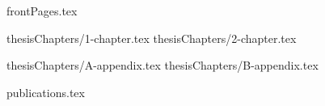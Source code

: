 \documentclass[a4paper,12pt,oneside,openany]{book}
\begin{document}
 {frontPages.tex}


 {thesisChapters/1-chapter.tex}
 {thesisChapters/2-chapter.tex}


\newpage\appendix

 {thesisChapters/A-appendix.tex}
 {thesisChapters/B-appendix.tex}


\newpage
{}
\singlespacing
\printbibliography[title={\bibName}]

\ifnum{}
\newpage
{}
 {publications.tex}
\fi
\end{document}
